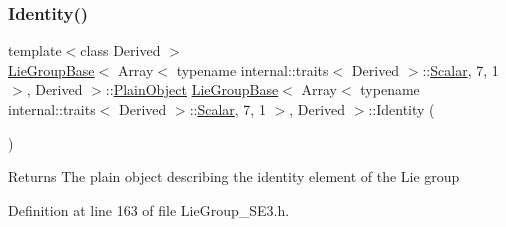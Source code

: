 \subsubsection{\texorpdfstring{Identity()}{Identity()}}
{\footnotesize\ttfamily template$<$class Derived $>$ \\
\hyperlink{class_lie_group_base}{Lie\+Group\+Base}$<$ Array$<$ typename internal\+::traits$<$ Derived $>$\+::\hyperlink{class_lie_group_base_3_01_array_3_01typename_01internal_1_1traits_3_01_derived_01_4_1_1_scalar_0d6d4b5459662fc32c7117aee50362fb1_a831695c575380c9a1df32eff9fc4a8c6}{Scalar}, 7, 1 $>$, Derived $>$\+::\hyperlink{class_lie_group_base_3_01_array_3_01typename_01internal_1_1traits_3_01_derived_01_4_1_1_scalar_0d6d4b5459662fc32c7117aee50362fb1_a950a48c9e027bcd00193aa20a59ee723}{Plain\+Object} \hyperlink{class_lie_group_base}{Lie\+Group\+Base}$<$ Array$<$ typename internal\+::traits$<$ Derived $>$\+::\hyperlink{class_lie_group_base_3_01_array_3_01typename_01internal_1_1traits_3_01_derived_01_4_1_1_scalar_0d6d4b5459662fc32c7117aee50362fb1_a831695c575380c9a1df32eff9fc4a8c6}{Scalar}, 7, 1 $>$, Derived $>$\+::Identity (\begin{DoxyParamCaption}{ }\end{DoxyParamCaption})\hspace{0.3cm}{\ttfamily [static]}}

\begin{DoxyReturn}{Returns}
The plain object describing the identity element of the Lie group 
\end{DoxyReturn}


Definition at line 163 of file Lie\+Group\+\_\+\+S\+E3.\+h.

\hypertarget{class_lie_group_base_3_01_array_3_01typename_01internal_1_1traits_3_01_derived_01_4_1_1_scalar_0d6d4b5459662fc32c7117aee50362fb1_a05e8da8cba6d186d3f4e146d282eb020}{}\label{class_lie_group_base_3_01_array_3_01typename_01internal_1_1traits_3_01_derived_01_4_1_1_scalar_0d6d4b5459662fc32c7117aee50362fb1_a05e8da8cba6d186d3f4e146d282eb020} 
